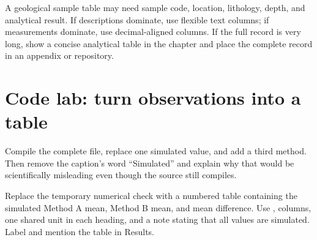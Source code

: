 \begin{scienceinpractice}
A geological sample table may need sample code, location, lithology, depth,
and analytical result. If descriptions dominate, use flexible text columns; if
measurements dominate, use decimal-aligned columns. If the full record is very
long, show a concise analytical table in the chapter and place the complete
record in an appendix or repository.
\end{scienceinpractice}

\section{Code lab: turn observations into a table}

\begin{codelab}
Compile the complete file, replace one simulated value, and add a third method.
Then remove the caption's word ``Simulated'' and explain why that would be
scientifically misleading even though the source still compiles.
\end{codelab}


\chapterproject

\begin{miniproject}
Replace the temporary numerical check with a numbered table containing the
simulated Method A mean, Method B mean, and mean difference. Use
,  columns, one shared unit in each heading, and a note
stating that all values are simulated. Label and mention the table in Results.
\end{miniproject}

\chaptersummary

